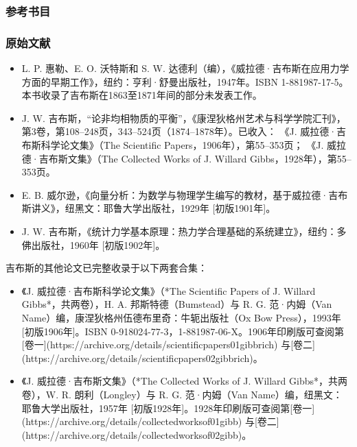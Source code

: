 \subsubsection{参考书目}
\subsubsection{原始文献}
\begin{itemize}
\item L. P. 惠勒、E. O. 沃特斯和 S. W. 达德利（编），《威拉德·吉布斯在应用力学方面的早期工作》，纽约：亨利·舒曼出版社，1947年。ISBN 1-881987-17-5。本书收录了吉布斯在1863至1871年间的部分未发表工作。
\item J. W. 吉布斯，“论非均相物质的平衡”，《康涅狄格州艺术与科学学院汇刊》，第3卷，第108–248页，343–524页（1874–1878年）。已收入：
《J. 威拉德·吉布斯科学论文集》（The Scientific Papers，1906年），第55–353页；
《J. 威拉德·吉布斯文集》（The Collected Works of J. Willard Gibbs，1928年），第55–353页。
\item E. B. 威尔逊，《向量分析：为数学与物理学生编写的教材，基于威拉德·吉布斯讲义》，纽黑文：耶鲁大学出版社，1929年 [初版1901年]。
\item J. W. 吉布斯，《统计力学基本原理：热力学合理基础的系统建立》，纽约：多佛出版社，1960年 [初版1902年]。
\end{itemize}
吉布斯的其他论文已完整收录于以下两套合集：
\begin{itemize}
\item 《J. 威拉德·吉布斯科学论文集》（*The Scientific Papers of J. Willard Gibbs*，共两卷），H. A. 邦斯特德（Bumstead）与 R. G. 范·内姆（Van Name）编，康涅狄格州伍德布里奇：牛轭出版社（Ox Bow Press），1993年 [初版1906年]。ISBN 0-918024-77-3，1-881987-06-X。1906年印刷版可查阅第[卷一](https://archive.org/details/scientificpapers01gibbrich) 与[卷二](https://archive.org/details/scientificpapers02gibbrich)。
\item 《J. 威拉德·吉布斯文集》（*The Collected Works of J. Willard Gibbs*，共两卷），W. R. 朗利（Longley）与 R. G. 范·内姆（Van Name）编，纽黑文：耶鲁大学出版社，1957年 [初版1928年]。1928年印刷版可查阅第[卷一](https://archive.org/details/collectedworksof01gibb) 与[卷二](https://archive.org/details/collectedworksof02gibb)。
\end{itemize}

